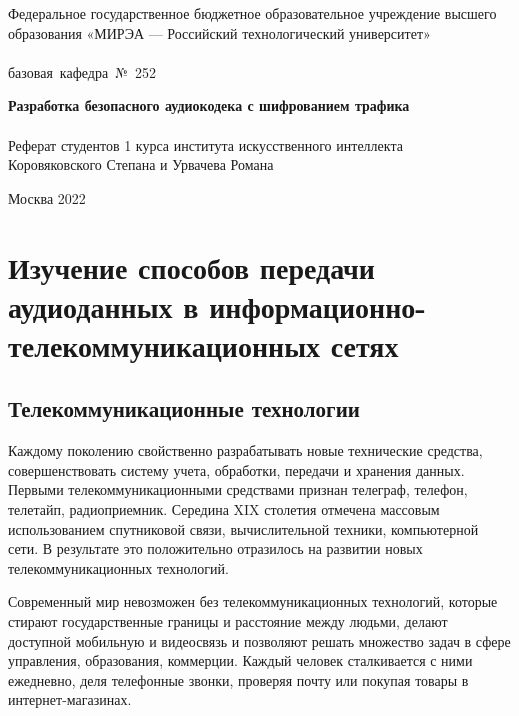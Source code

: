 \documentclass[a4paper]{report}
\begin{document}
\begin{titlepage}
\newpage



\begin{center}
\vfill

Федеральное государственное бюджетное образовательное учреждение высшего образования «МИРЭА — Российский технологический университет»\\
\ \\

\hfill\vbox
{
\hbox{базовая кафедра № 252}
}

\vfill

{\large\bf Разработка безопасного аудиокодека с шифрованием трафика\\}
\ \\
Реферат студентов 1 курса института искусственного интеллекта\\
Коровяковского Степана и Урвачева Романа

\vfill


\vfill

Москва 2022
\end{center}

\end{titlepage}
\tableofcontents
\newpage

\chapter{Изучение способов передачи аудиоданных в информационно-телекоммуникационных сетях}
\section{Телекоммуникационные технологии}
Каждому поколению свойственно разрабатывать новые технические средства, совершенствовать систему учета, обработки, передачи и хранения данных. Первыми телекоммуникационными средствами признан телеграф, телефон, телетайп, радиоприемник. Середина XIX столетия отмечена массовым использованием спутниковой связи, вычислительной техники, компьютерной сети. В результате это положительно отразилось на развитии новых телекоммуникационных технологий.
\par Современный мир невозможен без телекоммуникационных технологий, которые стирают государственные границы и расстояние между людьми, делают доступной мобильную и видеосвязь и позволяют решать множество задач в сфере управления, образования, коммерции. Каждый человек сталкивается с ними ежедневно, деля телефонные звонки, проверяя почту или покупая товары в интернет-магазинах.
\end{document}

